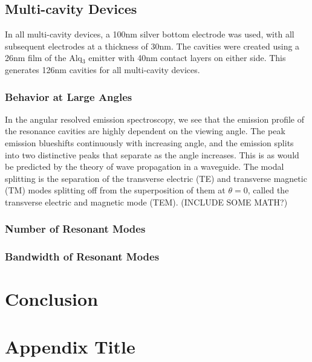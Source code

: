 \documentclass{report}
\begin{document}
    \section{Multi-cavity Devices}
        In all multi-cavity devices, a 100nm silver bottom electrode was used, with all subsequent electrodes at a thickness of 30nm. The cavities were created using a 26nm film of the Alq$_3$ emitter with 40nm contact layers on either side. This generates 126nm cavities for all multi-cavity devices.
    
        \subsection{Behavior at Large Angles}
		In the angular resolved emission spectroscopy, we see that the emission profile of the resonance cavities are highly dependent on the viewing angle. The peak emission blueshifts continuously with increasing angle, and the emission splits into two distinctive peaks that separate as the angle increases. This is as would be predicted by the theory of wave propagation in a waveguide. The modal splitting is the separation of the transverse electric (TE) and transverse magnetic (TM) modes splitting off from the superposition of them at $\theta=0$, called the transverse electric and magnetic mode (TEM). (INCLUDE SOME MATH?)
    
        \subsection{Number of Resonant Modes}
        
        \subsection{Bandwidth of Resonant Modes}

\chapter{Conclusion}

\appendix
\chapter{Appendix Title}
\end{document}
